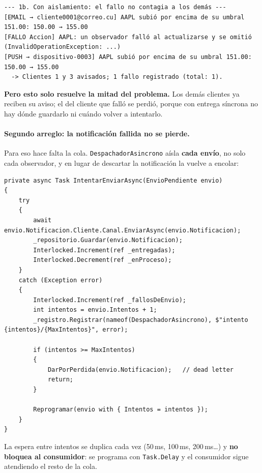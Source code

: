 \begin{lstlisting}[language={}, numbers=none, basicstyle=\ttfamily\scriptsize, columns=fullflexible, keepspaces=true]
--- 1b. Con aislamiento: el fallo no contagia a los demás ---
[EMAIL → cliente0001@correo.cu] AAPL subió por encima de su umbral 151.00: 150.00 → 155.00
[FALLO Accion] AAPL: un observador falló al actualizarse y se omitió (InvalidOperationException: ...)
[PUSH → dispositivo-0003] AAPL subió por encima de su umbral 151.00: 150.00 → 155.00
  -> Clientes 1 y 3 avisados; 1 fallo registrado (total: 1).
\end{lstlisting}

\textbf{Pero esto solo resuelve la mitad del problema.} Los demás clientes ya reciben su
aviso; el del cliente que falló se perdió, porque con entrega síncrona no hay dónde
guardarlo ni cuándo volver a intentarlo.

\paragraph{Segundo arreglo: la notificación fallida no se pierde.}
Para eso hace falta la cola. \texttt{DespachadorAsincrono} aísla \textbf{cada envío}, no
solo cada observador, y en lugar de descartar la notificación la vuelve a encolar:

\begin{lstlisting}[basicstyle=\ttfamily\footnotesize, columns=fullflexible, keepspaces=true, caption={\texttt{DespachadorAsincrono}: aislamiento por envío, reintento y dead letter.}]
private async Task IntentarEnviarAsync(EnvioPendiente envio)
{
    try
    {
        await envio.Notificacion.Cliente.Canal.EnviarAsync(envio.Notificacion);
        _repositorio.Guardar(envio.Notificacion);
        Interlocked.Increment(ref _entregadas);
        Interlocked.Decrement(ref _enProceso);
    }
    catch (Exception error)
    {
        Interlocked.Increment(ref _fallosDeEnvio);
        int intentos = envio.Intentos + 1;
        _registro.Registrar(nameof(DespachadorAsincrono), $"intento {intentos}/{MaxIntentos}", error);

        if (intentos >= MaxIntentos)
        {
            DarPorPerdida(envio.Notificacion);   // dead letter
            return;
        }

        Reprogramar(envio with { Intentos = intentos });
    }
}
\end{lstlisting}

La espera entre intentos se duplica cada vez (50\,ms, 100\,ms, 200\,ms\dots) y \textbf{no
bloquea al consumidor}: se programa con \texttt{Task.Delay} y el consumidor sigue atendiendo
el resto de la cola.

